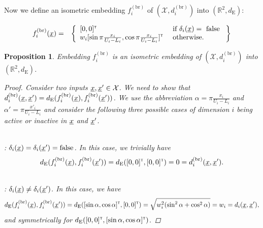 \documentclass[letterpaper]{article}
\newcommand{\vect}[1]{\underline{\smash{#1}}}
\renewcommand{\v}[1]{\vect{#1}}
\newcommand{\reals}{\mathds{R}}
\newcommand{\sX}{\mathcal{X}}
\newcommand{\br}{^{(\text{br})}}
\newcommand\transpose{{\textrm{\tiny{\sf{T}}}}}
\newtheorem{prop}[thm]{Proposition}
\begin{document}
Now we define an isometric embedding $f_i\br$ of $(\sX, d_i\br)$ into $(\reals^{2},d_{\text{E}})$:

\begin{eqnarray}
\nonumber{}f_i\br(\v{x}) & = & \left\{\begin{array}{ll}
[0,0]^\transpose & \textrm{ if } \delta_i(\v{x}) = \textrm{ false }\\
\nonumber{} w_i [\sin{\pi\frac{x_i}{U_i-L_i}}, \cos{\pi\frac{x_i}{U_i-L_i}}]^\transpose & \textrm{ otherwise.}\end{array}\right\}
\end{eqnarray}

\begin{prop}Embedding $f_i\br$ is an isometric embedding of $(\sX, d_i\br)$ into $(\reals^2, d_{\text{E}})$.
\label{prop:f_d_cont_isometric}
\begin{proof}
Consider two inputs $\v{x},\v{x}' \in \sX$. We need to show that $d_i\br(\v{x},\v{x}') = d_{\text{E}}(f_i\br(\v{x}),f_i\br(\v{x}'))$.
We use the abbreviation $\alpha = \pi\frac{x_i}{U_i-L_i}$ and $\alpha' = \pi\frac{x'_i}{U_i-L_i}$ and consider the following three possible cases of dimension $i$ being active or inactive in $\v{x}$ and $\v{x}'$.

~\\: $\delta_i(\v{x}) = \delta_i(\v{x}') = \textrm{false}$.
In this case, we trivially have 
\[d_{\text{E}}(f_i\br(\v{x}),f_i\br(\v{x}')) = d_{\text{E}}([0,0]^\transpose, [0,0]^\transpose) = 0 = d_i\br(\v{x},\v{x}').\]

~\\: $\delta_i(\v{x}) \neq \delta_i(\v{x}')$. In this case, we have
\[d_{\text{E}}(f_i\br(\v{x}),f_i\br(\v{x}')) = d_{\text{E}}([\sin{\alpha}, \cos{\alpha}]^\transpose, [0,0]^\transpose) = \sqrt{w_i^2 (\sin^2{\alpha} + \cos^2{\alpha})} = w_i = d_i(\v{x},\v{x}'),\]
and symmetrically for $d_{\text{E}}([0,0]^\transpose, [\sin{\alpha}, \cos{\alpha}]^\transpose)$.


\end{proof}
\end{prop}
\end{document}
